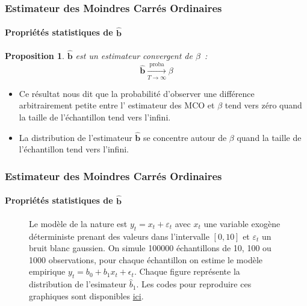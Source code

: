 \documentclass[10pt]{beamer}
\theoremstyle{plain}
\newtheorem{prop}{Proposition}
\begin{document}
\begin{frame}
  \frametitle{Estimateur des Moindres Carrés Ordinaires}
  \framesubtitle {Propriétés statistiques de $\hat{\mathbf b}$}


  \begin{prop}\label{prop:mco:convergence}
    $\hat{\mathbf b}$ est un estimateur convergent de $\beta$~:
    \[
      \hat{\mathbf b} \underset{T\to\infty}{\overset{\text{proba}}{\longrightarrow}} \beta
    \]
  \end{prop}

  \bigskip\bigskip

  \begin{itemize}

  \item Ce résultat nous dit que la probabilité d'observer une différence arbitrairement petite entre l' estimateur des MCO et $\beta$ tend vers zéro quand la taille de l'échantillon tend vers l'infini.\newline

  \item La distribution de l'estimateur $\hat{\mathbf b}$ se concentre autour de $\beta$ quand la taille de l'échantillon tend vers l'infini.

  \end{itemize}

\end{frame}

\clearpage

\begin{frame}
  \frametitle{Estimateur des Moindres Carrés Ordinaires}
  \framesubtitle {Propriétés statistiques de $\hat{\mathbf b}$}

  \begin{figure}
    \centering
      \scalebox{.425}{
    }
  \caption{Le modèle de la nature est $y_t = x_t + \varepsilon_t$ avec $x_t$ une variable exogène déterministe prenant des valeurs dans l'intervalle $[0,10]$ et $\varepsilon_t$ un bruit blanc gaussien. On simule 100000  échantillons de 10, 100 ou 1000 observations, pour chaque échantillon on estime le modèle empirique $y_t = b_0 + b_1 x_t + \epsilon_t$. Chaque figure représente la distribution de l'esimateur $\hat b_1$. Les codes pour reproduire ces graphiques sont disponibles \href{https://mnemosyne.ithaca.fr/stephane/econometrics/-/blob/\HEAD/cours/codes/chapitre-1/ols-convergence.py}{ici}.}
\end{figure}
\end{frame}
\end{document}
